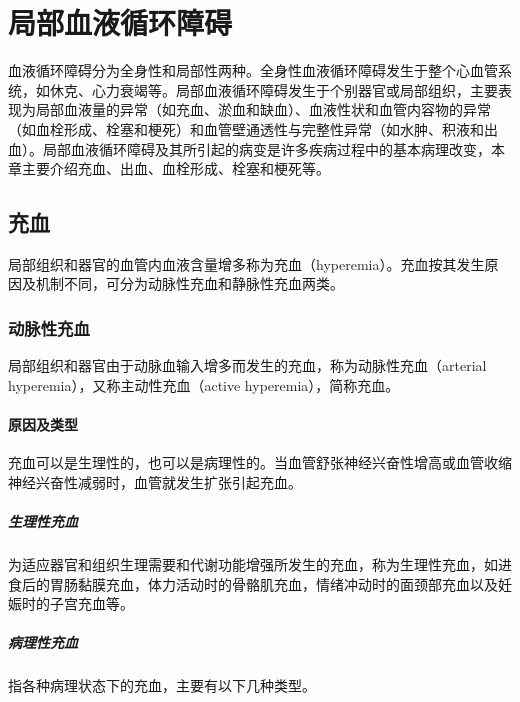 
\chapter{局部血液循环障碍}


血液循环障碍分为全身性和局部性两种。全身性血液循环障碍发生于整个心血管系统，如休克、心力衰竭等。局部血液循环障碍发生于个别器官或局部组织，主要表现为局部血液量的异常（如充血、淤血和缺血）、血液性状和血管内容物的异常（如血栓形成、栓塞和梗死）和血管壁通透性与完整性异常（如水肿、积液和出血）。局部血液循环障碍及其所引起的病变是许多疾病过程中的基本病理改变，本章主要介绍充血、出血、血栓形成、栓塞和梗死等。
\section{充血}

局部组织和器官的血管内血液含量增多称为充血（hyperemia）。充血按其发生原因及机制不同，可分为动脉性充血和静脉性充血两类。

\subsection{动脉性充血}

局部组织和器官由于动脉血输入增多而发生的充血，称为动脉性充血（arterial
hyperemia），又称主动性充血（active hyperemia），简称充血。

\subsubsection{原因及类型}

充血可以是生理性的，也可以是病理性的。当血管舒张神经兴奋性增高或血管收缩神经兴奋性减弱时，血管就发生扩张引起充血。

\paragraph{生理性充血}
为适应器官和组织生理需要和代谢功能增强所发生的充血，称为生理性充血，如进食后的胃肠黏膜充血，体力活动时的骨骼肌充血，情绪冲动时的面颈部充血以及妊娠时的子宫充血等。

\paragraph{病理性充血}
指各种病理状态下的充血，主要有以下几种类型。

